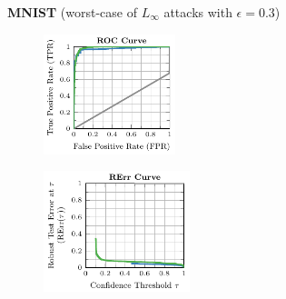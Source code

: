 \begin{figure}[t]
    \begin{subfigure}[t]{0.485\textwidth}
        \vspace*{0px}
        
        \centering
        \textbf{MNIST} (worst-case of $L_\infty$ attacks with $\epsilon = 0.3$)
        
        \begin{subfigure}[t]{0.47\textwidth}
            \vspace*{0px}
            
            \centering
            \includegraphics[height=3.5cm]{fig_mnist_roc}
        \end{subfigure}
        \begin{subfigure}[t]{0.49\textwidth}
            \vspace*{0px}
            
            \centering			
            \includegraphics[height=3.5cm]{fig_mnist_rte}
        \end{subfigure}
        \begin{subfigure}{0.925\textwidth}
        \end{subfigure}
    \end{subfigure}
    \hfill
    \vrule
    \hfill
    \begin{subfigure}[t]{0.485\textwidth}
        \vspace*{0px}
        

\end{subfigure}
\end{figure}

